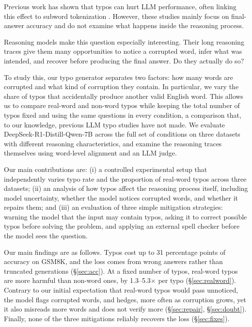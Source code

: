 \documentclass[11pt]{article}
\begin{document}
Previous work has shown that typos can hurt LLM performance, often linking this
effect to subword tokenization \citep{gan2024,chai2024,zhao2026}. However, these
studies mainly focus on final-answer accuracy and do not examine what happens
inside the reasoning process.

Reasoning models make this question especially interesting. Their long reasoning
traces give them many opportunities to notice a corrupted word, infer what was
intended, and recover before producing the final answer. Do they actually do so?

To study this, our typo generator separates two factors: how many words are
corrupted and what kind of corruption they contain. In particular, we vary the
share of typos that accidentally produce another valid English word. This allows
us to compare real-word and non-word typos while keeping the total number of
typos fixed and using the same questions in every condition, a comparison that,
to our knowledge, previous LLM typo studies have not made. We evaluate
DeepSeek-R1-Distill-Qwen-7B \citep{deepseekr1} across the full set of conditions
on three datasets with different reasoning characteristics, and examine the
reasoning traces themselves using word-level alignment and an LLM judge.

Our main contributions are: (i) a controlled experimental setup that
independently varies typo rate and the proportion of real-word typos across
three datasets; (ii) an analysis of how typos affect the reasoning process
itself, including model uncertainty, whether the model notices corrupted words,
and whether it repairs them; and (iii) an evaluation of three simple mitigation
strategies: warning the model that the input may contain typos, asking it to
correct possible typos before solving the problem, and applying an external
spell checker before the model sees the question.

Our main findings are as follows. Typos cost up to 31 percentage points of
accuracy on GSM8K, and the loss comes from wrong answers rather than truncated
generations (\S\ref{sec:acc}). At a fixed number of typos, real-word typos are
more harmful than non-word ones, by 1.3--5.3$\times$ per typo
(\S\ref{sec:realword}). Contrary to our initial expectation that real-word
typos would pass unnoticed, the model flags corrupted words, and hedges, more
often as corruption grows, yet it also misreads more words and does not verify
more (\S\ref{sec:repair}, \S\ref{sec:doubt}). Finally, none of the three
mitigations reliably recovers the loss (\S\ref{sec:fixes}).
\end{document}
